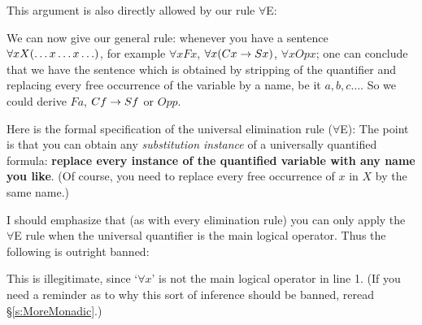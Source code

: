 
This argument is also directly allowed by our rule $\forall$E:
\begin{fitchproof}
	 
\end{fitchproof}

We can now give our general rule: whenever you have a sentence $\forall xX(\ldots x \ldots x\ldots)$, for example $\forall x Fx$, $\forall x (Cx\rightarrow Sx)$, $\forall x Opx$; one can conclude that we have the sentence which is obtained by stripping of the quantifier and replacing every free occurrence of the variable by a name, be it $a,b,c\ldots$. So we could derive $Fa$, $Cf\rightarrow Sf$ or $Opp$.


Here is the formal specification of the universal elimination rule ($\forall$E):
The point is that you can obtain any \emph{substitution instance} of a universally quantified formula: \textbf{replace every instance of the quantified variable with any name you like}. (Of course, you need to replace every free occurrence of $x$ in $X$ by the same name.)

I should emphasize that (as with every elimination rule) you can only apply the $\forall$E rule when the universal quantifier is the main logical operator. Thus the following is outright banned:
\begin{fitchproof}
\end{fitchproof}
This is illegitimate, since `$\forall x$' is not the main logical operator in line 1. (If you need a reminder as to why this sort of inference should be banned, reread \S\ref{s:MoreMonadic}.)

